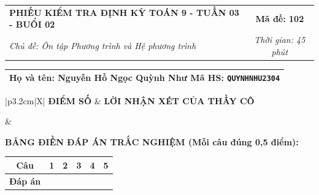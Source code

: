 \documentclass[12pt,a4paper]{article}
\begin{document}
\newpage


\noindent
\begin{tabularx}{\linewidth}{|X|c|}
\hline
\textbf{PHIẾU KIỂM TRA ĐỊNH KỲ TOÁN 9 - TUẦN 03 - BUỔI 02} & \textbf{Mã đề: 102} \\
\textit{Chủ đề: Ôn tập Phương trình và Hệ phương trình} & \textit{Thời gian: 45 phút} \\
\hline
\end{tabularx}

\vspace{1mm}

\noindent
\begin{tabularx}{\linewidth}{|X|}
\hline
\rule[-2mm]{0pt}{7.5mm}\textbf{Họ và tên:} \textbf{\large Nguyễn Hồ Ngọc Quỳnh Như} \hfill \textbf{Mã HS:} \texttt{QUYNHNHU2304} \quad \\
\hline
\end{tabularx}

\vspace{1mm}

\noindent
\begin{tabularx}{\linewidth}{|p{3.2cm}|X|}
\hline
\centering\textbf{ĐIỂM SỐ} & \centering\textbf{LỜI NHẬN XÉT CỦA THẦY CÔ} \tabularnewline
\hline
\rule{0pt}{1.3cm} & \tabularnewline
\hline
\end{tabularx}

\vspace{1.2mm}

\noindent\textbf{BẢNG ĐIỀN ĐÁP ÁN TRẮC NGHIỆM (Mỗi câu đúng 0,5 điểm):}
\vspace{0.8mm}

\noindent
\renewcommand{\arraystretch}{1.35}
\begin{tabularx}{\linewidth}{|c|*{5}{>{\centering\arraybackslash}X|}}
\hline
\textbf{Câu} & \textbf{1} & \textbf{2} & \textbf{3} & \textbf{4} & \textbf{5} \\
\hline
\textbf{Đáp án} & & & & & \\
\hline
\end{tabularx}
\renewcommand{\arraystretch}{1.0}

\vspace{1.5mm}
\end{document}
